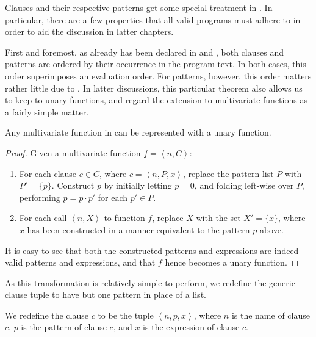 Clauses and their respective patterns get some special treatment in \D{}. In
particular, there are a few properties that all valid \D{} programs must
adhere to in order to aid the discussion in latter chapters.

First and foremost, as already has been declared in
 and , both
clauses and patterns are ordered by their occurrence in the program text. In
both cases, this order superimposes an evaluation order. For patterns, however,
this order matters rather little due to .
In latter discussions, this particular theorem also allows us to keep to unary
functions, and regard the extension to multivariate functions as a fairly
simple matter.

\begin{theorem}\label{theorem:multivariate-to-unary} Any multivariate function
in \D{} can be represented with a unary function.\end{theorem}

\begin{proof}

Given a multivariate function $f= \left\langle n,C \right\rangle$:

\begin{enumerate}

\item For each clause $c\in C$, where $c=\left\langle n,P,x \right\rangle$,
replace the pattern list $P$ with $P'=\{p\}$. Construct $p$ by initially
letting $p=0$, and folding left-wise over $P$, performing $p=p\cdot p'$ for
each $p'\in P$. 

\item For each call $\left\langle n, X\right\rangle$ to function $f$, replace
$X$ with the set $X'=\{x\}$, where $x$ has been constructed in a manner
equivalent to the pattern $p$ above.

\end{enumerate}

It is easy to see that both the constructed patterns and expressions are indeed
valid patterns and expressions, and that $f$ hence becomes a unary
function.\end{proof}

As this transformation is relatively simple to perform, we redefine the generic
clause tuple to have but one pattern in place of a list. 

\begin{definition} We redefine the clause $c$ to be the tuple $\left\langle
n,p,x\right\rangle$, where $n$ is the name of clause $c$, $p$ is the pattern of
clause $c$, and $x$ is the expression of clause $c$.\end{definition}

